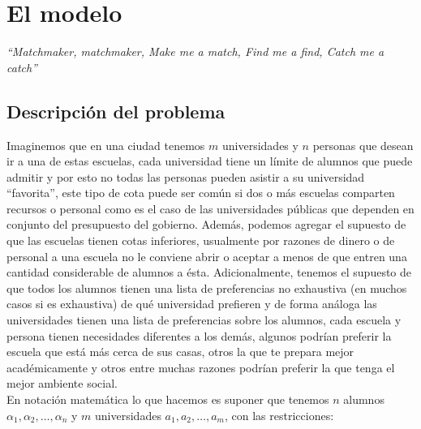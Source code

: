 \chapter{El modelo}
\begin{flushright}
\textit{``Matchmaker, matchmaker,
Make me a match, Find me a find,
Catch me a catch''}
\end{flushright}
\section{Descripción del problema}
Imaginemos que en una ciudad tenemos $m$ universidades y $n$ personas que desean ir a una de estas escuelas, cada universidad tiene un límite de alumnos que puede admitir y por esto no todas las personas pueden asistir a su universidad
 ``favorita'', este tipo de cota puede ser común si dos o más escuelas comparten recursos o personal como es el caso de las universidades públicas que dependen en conjunto del presupuesto del gobierno. 
Además, podemos agregar el supuesto de que las escuelas tienen cotas inferiores, usualmente por razones de dinero o de personal a una escuela no le conviene abrir o aceptar a menos de que entren una cantidad considerable de alumnos a ésta. Adicionalmente, tenemos el supuesto de que todos los alumnos tienen una lista de preferencias no exhaustiva (en muchos casos si es exhaustiva) de qué universidad prefieren y de forma análoga las universidades tienen una lista de preferencias sobre los alumnos, cada escuela y persona tienen necesidades diferentes a los demás, algunos podrían preferir la escuela que está más cerca de sus casas, otros la que te prepara mejor académicamente y otros entre muchas razones podrían preferir la que tenga el mejor ambiente social. 
\\ En notación matemática lo que hacemos es suponer que tenemos $n$ alumnos $\alpha_1, \alpha_2, \ldots, \alpha_n$ y $m$ universidades $a_1, a_2, \ldots, a_m$, con las restricciones: 

